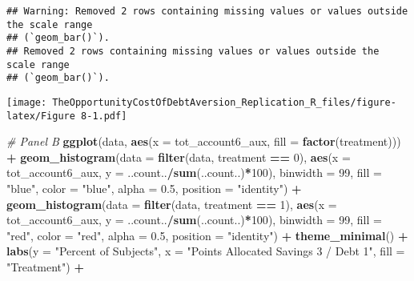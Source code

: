 \documentclass[
]{article}
\newenvironment{Shaded}{\begin{snugshade}}{\end{snugshade}}
\newcommand{\AttributeTok}[1]{\textcolor[rgb]{0.13,0.29,0.53}{#1}}
\newcommand{\CommentTok}[1]{\textcolor[rgb]{0.56,0.35,0.01}{\textit{#1}}}
\newcommand{\DecValTok}[1]{\textcolor[rgb]{0.00,0.00,0.81}{#1}}
\newcommand{\FloatTok}[1]{\textcolor[rgb]{0.00,0.00,0.81}{#1}}
\newcommand{\FunctionTok}[1]{\textcolor[rgb]{0.13,0.29,0.53}{\textbf{#1}}}
\newcommand{\NormalTok}[1]{#1}
\newcommand{\SpecialCharTok}[1]{\textcolor[rgb]{0.81,0.36,0.00}{\textbf{#1}}}
\newcommand{\StringTok}[1]{\textcolor[rgb]{0.31,0.60,0.02}{#1}}
\begin{document}
\begin{verbatim}
## Warning: Removed 2 rows containing missing values or values outside the scale range
## (`geom_bar()`).
## Removed 2 rows containing missing values or values outside the scale range
## (`geom_bar()`).
\end{verbatim}

\texttt{[image: TheOpportunityCostOfDebtAversion\_Replication\_R\_files/figure-latex/Figure 8-1.pdf]}

\begin{Shaded}
\begin{Highlighting}[]
\CommentTok{\# Panel B}
\FunctionTok{ggplot}\NormalTok{(data, }\FunctionTok{aes}\NormalTok{(}\AttributeTok{x =}\NormalTok{ tot\_account6\_aux, }\AttributeTok{fill =} \FunctionTok{factor}\NormalTok{(treatment))) }\SpecialCharTok{+}
  \FunctionTok{geom\_histogram}\NormalTok{(}\AttributeTok{data =} \FunctionTok{filter}\NormalTok{(data, treatment }\SpecialCharTok{==} \DecValTok{0}\NormalTok{),}
                 \FunctionTok{aes}\NormalTok{(}\AttributeTok{x =}\NormalTok{ tot\_account6\_aux, }\AttributeTok{y =}\NormalTok{ ..count..}\SpecialCharTok{/}\FunctionTok{sum}\NormalTok{(..count..)}\SpecialCharTok{*}\DecValTok{100}\NormalTok{),}
                 \AttributeTok{binwidth =} \DecValTok{99}\NormalTok{, }\AttributeTok{fill =} \StringTok{"blue"}\NormalTok{, }\AttributeTok{color =} \StringTok{"blue"}\NormalTok{, }\AttributeTok{alpha =} \FloatTok{0.5}\NormalTok{, }\AttributeTok{position =} \StringTok{"identity"}\NormalTok{) }\SpecialCharTok{+}
  \FunctionTok{geom\_histogram}\NormalTok{(}\AttributeTok{data =} \FunctionTok{filter}\NormalTok{(data, treatment }\SpecialCharTok{==} \DecValTok{1}\NormalTok{),}
                 \FunctionTok{aes}\NormalTok{(}\AttributeTok{x =}\NormalTok{ tot\_account6\_aux, }\AttributeTok{y =}\NormalTok{ ..count..}\SpecialCharTok{/}\FunctionTok{sum}\NormalTok{(..count..)}\SpecialCharTok{*}\DecValTok{100}\NormalTok{),}
                 \AttributeTok{binwidth =} \DecValTok{99}\NormalTok{, }\AttributeTok{fill =} \StringTok{"red"}\NormalTok{, }\AttributeTok{color =} \StringTok{"red"}\NormalTok{, }\AttributeTok{alpha =} \FloatTok{0.5}\NormalTok{, }\AttributeTok{position =} \StringTok{"identity"}\NormalTok{) }\SpecialCharTok{+}
  \FunctionTok{theme\_minimal}\NormalTok{() }\SpecialCharTok{+}
  \FunctionTok{labs}\NormalTok{(}\AttributeTok{y =} \StringTok{"Percent of Subjects"}\NormalTok{, }\AttributeTok{x =} \StringTok{"Points Allocated Savings 3 / Debt 1"}\NormalTok{, }\AttributeTok{fill =} \StringTok{"Treatment"}\NormalTok{) }\SpecialCharTok{+}

\end{Highlighting}
\end{Shaded}
\end{document}
